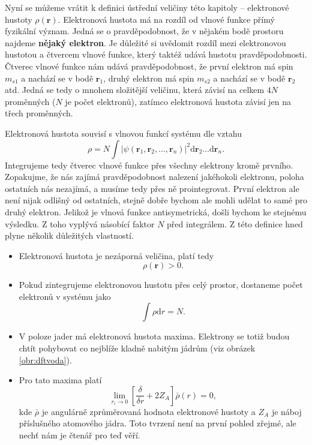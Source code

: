 Nyní se můžeme vrátit k definici ústřední veličiny této kapitoly -- elektronové hustoty $\rho(\mathbf{r})$.
Elektronová hustota má na rozdíl od vlnové funkce přímý fyzikální význam. Jedná se o pravděpodobnost, že v nějakém bodě prostoru najdeme \textbf{nějaký elektron}. Je důležité si uvědomit rozdíl mezi elektronovou hustotou a čtvercem vlnové funkce, který taktéž udává hustotu pravděpodobnosti. Čtverec vlnové funkce nám udává pravděpodobnost, že první elektron má spin $m_{s1}$ a nachází se v bodě $\mathbf{r}_1$, druhý elektron má spin $m_{s2}$ a nachází se v bodě $\mathbf{r}_2$ atd. Jedná se tedy o mnohem složitější veličinu, která závisí na celkem $4N$ proměnných ($N$ je počet elektronů), zatímco elektronová hustota závisí jen na třech proměnných.

Elektronová hustota souvisí s vlnovou funkcí systému dle vztahu
\begin{equation}
\rho=N \int |\psi(\textbf{r}_1,\textbf{r}_2,...,\textbf{r}_n)|^2 \mathrm{d}\textbf{r}_2\dots\mathrm{d}\textbf{r}_n .
\label{rov:dft:defrho}
\end{equation}
Integrujeme tedy čtverec vlnové funkce přes všechny elektrony kromě prvního. Zopakujme, že nás zajímá pravděpodobnost nalezení jakéhokoli elektronu, poloha ostatních nás nezajímá, a musíme tedy přes ně prointegrovat. První elektron ale není nijak odlišný od ostatních, stejně dobře bychom ale mohli udělat to samé pro druhý elektron. Jelikož je vlnová funkce antisymetrická, došli bychom ke stejnému výsledku. Z toho vyplývá násobící faktor $N$ před integrálem.
Z této definice hned plyne několik důležitých vlastností.

\begin{itemize}
\item Elektronová hustota je nezáporná veličina, platí tedy
\begin{equation}
\rho(\mathbf{r})  > 0 .
\end{equation}
\item Pokud zintegrujeme elektronovou hustotu přes celý prostor, dostaneme počet elektronů v systému jako
\begin{equation}
\int \rho\mathrm{d}r = N.
\end{equation}

\item V poloze jader má elektronová hustota maxima. Elektrony se totiž budou chtít pohybovat co nejblíže kladně nabitým jádrům (viz obrázek \ref{obr:dftvoda}). 

\item Pro tato maxima platí
\begin{equation}
\lim_{r_i \to 0} \left[ \frac{\delta}{\delta r}+2Z_A\right]\bar{\rho}(r)=0, 
\end{equation}
kde $\bar{\rho}$ je angulárně zprůměrovaná hodnota elektronové hustoty a $Z_A$ je náboj příslušného atomového jádra. Toto tvrzení není na první pohled zřejmé, ale nechť nám je čtenář pro teď věří.
\end{itemize}

